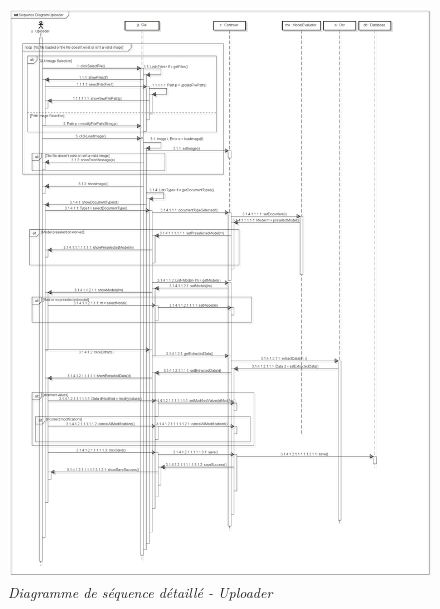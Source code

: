 \begin{figure}[!h]
	\begin{center}
		\includegraphics[scale = 0.3]{img/globalSeqDiagDetailled.png}
	\end{center}
	\caption{\it Diagramme de séquence détaillé - Uploader}
	\label{seqDiagGlobalDet}
\end{figure}

\newpage

